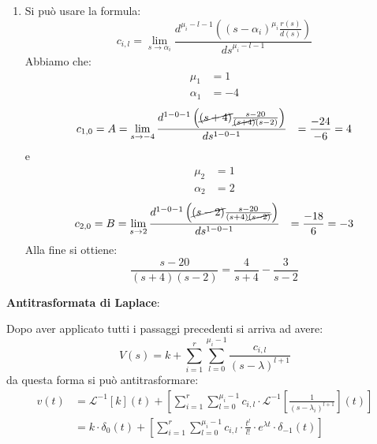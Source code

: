 \documentclass[a4paper]{article}
\begin{document}
\begin{example}
\begin{enumerate}
    \item Si può usare la formula:
      \[
        c_{i,l} = \lim_{s \to \alpha_i} \frac{d^{\mu_i-l-1} \left( \left( s-\alpha_i \right)^{\mu_i} \frac{r(s)}{d(s)} \right)}
        {d  s^{\mu_i-l-1}}
      \] 
      Abbiamo che:
      \[
      \begin{aligned}
        \mu_1 &= 1\\
        \alpha_1 &= -4
      \end{aligned}
      \] 
      \[
        \begin{aligned}
          c_{1,0} = A &= \lim_{s \to -4} \frac{d^{1-0-1} \left( \cancel{(s+4)} \frac{s-20}{\cancel{(s+4)}(s-2)} \right)}
          {d s^{1-0-1}}
                      &= \frac{-24}{-6} = 4\\
        \end{aligned}
      \] 
      e
      \[
      \begin{aligned}
        \mu_2 &= 1\\
        \alpha_2 &= 2
      \end{aligned}
      \] 
      \[
        \begin{aligned}
          c_{2,0} = B &= \lim_{s \to 2} \frac{d^{1-0-1} \left( \cancel{(s-2)} \frac{s-20}{(s+4)\cancel{(s-2)}} \right)}
          {d s^{1-0-1}}
                      &= \frac{-18}{6} = -3\\
        \end{aligned}
      \]
      Alla fine si ottiene:
      \[
        \frac{s-20}{(s+4)(s-2)} = \frac{4}{s+4} - \frac{3}{s-2}
      \] 
  \end{enumerate}
\end{example}

\vspace{1em}
\noindent
\textbf{Antitrasformata di Laplace}:

\noindent
Dopo aver applicato tutti i passaggi precedenti si arriva ad avere:
\[
  V(s) = k + \sum_{i=1}^{r} \sum_{l=0}^{\mu_i-1} \frac{c_{i,l}}{(s-\lambda)^{l+1}}
\] 
da questa forma si può antitrasformare:
\[
  \begin{aligned}
    v(t) &= \mathcal{L}^{-1}[k](t) + \left[\sum_{i=1}^{r} \sum_{l=0}^{\mu_i-1} c_{i,l} \cdot
              \mathcal{L}^{-1}\left[ \frac{1}{(s-\lambda_i)^{l+1}} \right](t)\right]\\
         &= k \cdot \delta_0(t) + \left[\sum_{i=1}^{r} \sum_{l=0}^{\mu_i-1} c_{i,l} \cdot \frac{t^l}{l!} \cdot e^{\lambda t} \cdot \delta_{-1}(t)\right]
  \end{aligned}
\] 
\end{document}
